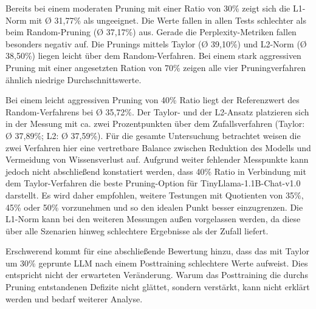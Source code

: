 Bereits bei einem moderaten Pruning mit einer Ratio von 30\% zeigt sich die
L1-Norm mit Ø 31,77\% als ungeeignet. Die Werte fallen in allen Tests schlechter
als beim Random-Pruning (Ø 37,17\%) aus. Gerade die Perplexity-Metriken fallen
besonders negativ auf. Die Prunings mittels Taylor (Ø 39,10\%) und L2-Norm (Ø
38,50\%) liegen leicht über dem Random-Verfahren. Bei einem stark aggressiven
Pruning mit einer angesetzten Ration von 70\% zeigen alle vier Pruningverfahren
ähnlich niedrige Durchschnittswerte.

Bei einem leicht aggressiven Pruning von 40\% Ratio liegt der Referenzwert des
Random-Verfahrens bei Ø 35,72\%. Der Taylor- und der L2-Ansatz platzieren sich
in der Messung mit ca. zwei Prozentpunkten über dem Zufallsverfahren (Taylor: Ø
37,89\%; L2: Ø 37,59\%). Für die gesamte Untersuchung betrachtet weisen die zwei
Verfahren hier eine vertretbare Balance zwischen Reduktion des Modells und
Vermeidung von Wissensverlust auf. Aufgrund weiter fehlender Messpunkte kann
jedoch nicht abschließend konstatiert werden, dass 40\% Ratio in Verbindung mit
dem Taylor-Verfahren die beste Pruning-Option für TinyLlama-1.1B-Chat-v1.0
darstellt. Es wird daher empfohlen, weitere Testungen mit Quotienten von 35\%,
45\% oder 50\% vorzunehmen und so den idealen Punkt besser einzugrenzen. Die
L1-Norm kann bei den weiteren Messungen außen vorgelassen werden, da diese über
alle Szenarien hinweg schlechtere Ergebnisse als der Zufall liefert.

Erschwerend kommt für eine abschließende Bewertung hinzu, dass das mit Taylor um
30\% geprunte LLM nach einem Posttraining schlechtere Werte aufweist. Dies
entspricht nicht der erwarteten Veränderung. Warum das Posttraining die durchs
Pruning entstandenen Defizite nicht glättet, sondern verstärkt, kann nicht
erklärt werden und bedarf weiterer Analyse.

\newpage
